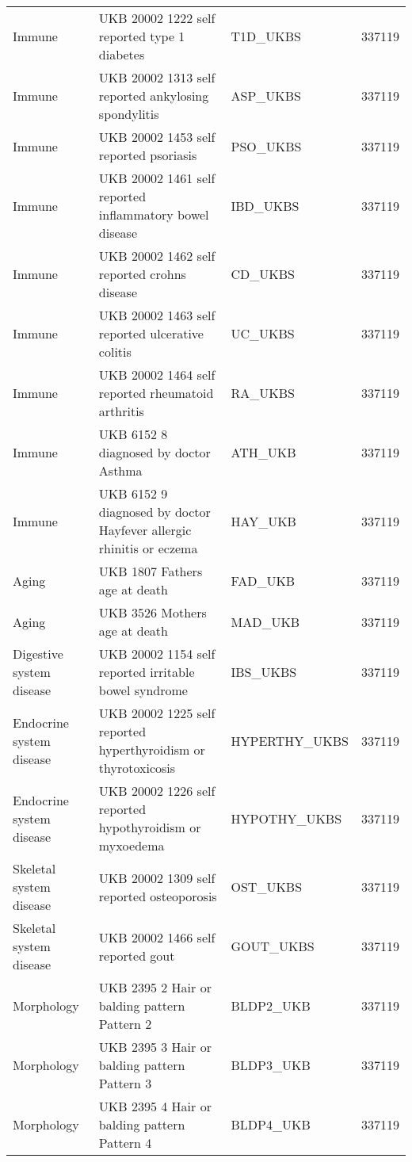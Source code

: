 \begin{table}[ht]
\begin{tabular}{lllr}
  Immune & UKB 20002 1222 self reported type 1 diabetes & T1D\_UKBS & 337119 \\ 
  Immune & UKB 20002 1313 self reported ankylosing spondylitis & ASP\_UKBS & 337119 \\ 
  Immune & UKB 20002 1453 self reported psoriasis & PSO\_UKBS & 337119 \\ 
  Immune & UKB 20002 1461 self reported inflammatory bowel disease & IBD\_UKBS & 337119 \\ 
  Immune & UKB 20002 1462 self reported crohns disease & CD\_UKBS & 337119 \\ 
  Immune & UKB 20002 1463 self reported ulcerative colitis & UC\_UKBS & 337119 \\ 
  Immune & UKB 20002 1464 self reported rheumatoid arthritis & RA\_UKBS & 337119 \\ 
  Immune & UKB 6152 8 diagnosed by doctor Asthma & ATH\_UKB & 337119 \\ 
  Immune & UKB 6152 9 diagnosed by doctor Hayfever allergic rhinitis or eczema & HAY\_UKB & 337119 \\ 
  Aging & UKB 1807 Fathers age at death & FAD\_UKB & 337119 \\ 
  Aging & UKB 3526 Mothers age at death & MAD\_UKB & 337119 \\ 
  Digestive system disease & UKB 20002 1154 self reported irritable bowel syndrome & IBS\_UKBS & 337119 \\ 
  Endocrine system disease & UKB 20002 1225 self reported hyperthyroidism or thyrotoxicosis & HYPERTHY\_UKBS & 337119 \\ 
  Endocrine system disease & UKB 20002 1226 self reported hypothyroidism or myxoedema & HYPOTHY\_UKBS & 337119 \\ 
  Skeletal system disease & UKB 20002 1309 self reported osteoporosis & OST\_UKBS & 337119 \\ 
  Skeletal system disease & UKB 20002 1466 self reported gout & GOUT\_UKBS & 337119 \\ 
  Morphology & UKB 2395 2 Hair or balding pattern Pattern 2 & BLDP2\_UKB & 337119 \\ 
  Morphology & UKB 2395 3 Hair or balding pattern Pattern 3 & BLDP3\_UKB & 337119 \\ 
  Morphology & UKB 2395 4 Hair or balding pattern Pattern 4 & BLDP4\_UKB & 337119 \\ 
   \hline
\end{tabular}
\end{table}
